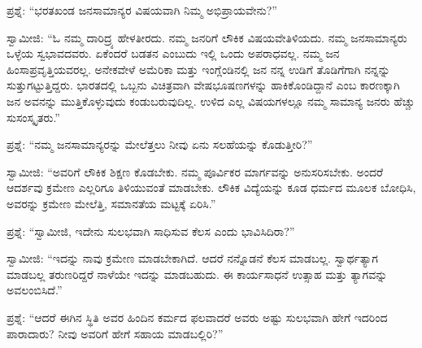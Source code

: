 \vskip 4pt

ಪ್ರಶ್ನೆ: “ಭರತಖಂಡ ಜನಸಾಮಾನ್ಯರ ವಿಷಯವಾಗಿ ನಿಮ್ಮ ಅಭಿಪ್ರಾಯವೇನು?”

\vskip 4pt

ಸ್ವಾಮೀಜಿ: “ಓ ನಮ್ಮ ದಾರಿದ್ರ್ಯ ಹೇಳತೀರದು. ನಮ್ಮ ಜನರಿಗೆ ಲೌಕಿಕ ವಿಷಯವೇ\break ತಿಳಿಯದು. ನಮ್ಮ ಜನಸಾಮಾನ್ಯರು ಒಳ್ಳೆಯ ಸ್ವಭಾವದವರು. ಏಕೆಂದರೆ ಬಡತನ ಎಂಬುದು ಇಲ್ಲಿ ಒಂದು ಅಪರಾಧವಲ್ಲ. ನಮ್ಮ ಜನ ಹಿಂಸಾಪ್ರವೃತ್ತಿಯವರಲ್ಲ. ಅನೇಕವೇಳೆ ಅಮೆರಿಕಾ ಮತ್ತು ಇಂಗ್ಲೆಂಡಿನಲ್ಲಿ ಜನ ನನ್ನ ಉಡಿಗೆ ತೊಡಿಗೆಗಾಗಿ ನನ್ನನ್ನು ಸುತ್ತುಗಟ್ಟುತ್ತಿದ್ದರು. ಭಾರತದಲ್ಲಿ ಒಬ್ಬನು ವಿಚಿತ್ರವಾಗಿ ವೇಷಭೂಷಣಗಳನ್ನು ಹಾಕಿಕೊಂಡಿದ್ದಾನೆ ಎಂಬ ಕಾರಣಕ್ಕಾಗಿ ಜನ ಅವನನ್ನು ಮುತ್ತಿಕೊಳ್ಳುವುದು ಕಂಡುಬರುವುದಿಲ್ಲ. ಉಳಿದ ಎಲ್ಲ ವಿಷಯಗಳಲ್ಲೂ ನಮ್ಮ ಸಾಮಾನ್ಯ ಜನರು ಹೆಚ್ಚು ಸುಸಂಸ್ಕೃತರು.”

\vskip 4pt

ಪ್ರಶ್ನೆ: “ನಮ್ಮ ಜನಸಾಮಾನ್ಯರನ್ನು ಮೇಲೆತ್ತಲು ನೀವು ಏನು ಸಲಹೆಯನ್ನು ಕೊಡುತ್ತೀರಿ?”

\vskip 4pt

ಸ್ವಾಮೀಜಿ: “ಅವರಿಗೆ ಲೌಕಿಕ ಶಿಕ್ಷಣ ಕೊಡಬೇಕು. ನಮ್ಮ ಪೂರ್ವಿಕರ ಮಾರ್ಗವನ್ನು ಅನುಸರಿಸಬೇಕು. ಅಂದರೆ ಆದರ್ಶವು ಕ್ರಮೇಣ ಎಲ್ಲರಿಗೂ ತಿಳಿಯುವಂತೆ ಮಾಡಬೇಕು. ಲೌಕಿಕ ವಿದ್ಯೆಯನ್ನು ಕೂಡ ಧರ್ಮದ ಮೂಲಕ ಬೋಧಿಸಿ, ಅವರನ್ನು ಕ್ರಮೇಣ ಮೇಲೆತ್ತಿ, ಸಮಾನತೆಯ ಮಟ್ಟಕ್ಕೆ ಏರಿಸಿ.”

\vskip 4pt

ಪ್ರಶ್ನೆ: “ಸ್ವಾಮೀಜಿ, ಇದೇನು ಸುಲಭವಾಗಿ ಸಾಧಿಸುವ ಕೆಲಸ ಎಂದು ಭಾವಿಸಿದಿರಾ?”

\vskip 4pt

ಸ್ವಾಮೀಜಿ: “ಇದನ್ನು ನಾವು ಕ್ರಮೇಣ ಮಾಡಬೇಕಾಗಿದೆ. ಆದರೆ ನನ್ನೊಡನೆ ಕೆಲಸ ಮಾಡಬಲ್ಲ. ಸ್ವಾರ್ಥತ್ಯಾಗ ಮಾಡಬಲ್ಲ ತರುಣರಿದ್ದರೆ ನಾಳೆಯೇ ಇದನ್ನು ಮಾಡಬಹುದು. ಈ ಕಾರ್ಯಸಾಧನೆ ಉತ್ಸಾಹ ಮತ್ತು ತ್ಯಾಗವನ್ನು ಅವಲಂಬಿಸಿದೆ.”

\vskip 4pt

ಪ್ರಶ್ನೆ: “ಆದರೆ ಈಗಿನ ಸ್ಥಿತಿ ಅವರ ಹಿಂದಿನ ಕರ್ಮದ ಫಲವಾದರೆ ಅವರು ಅಷ್ಟು ಸುಲಭವಾಗಿ ಹೇಗೆ ಇದರಿಂದ ಪಾರಾದಾರು? ನೀವು ಅವರಿಗೆ ಹೇಗೆ ಸಹಾಯ ಮಾಡಬಲ್ಲಿರಿ?”

\vskip 4pt

